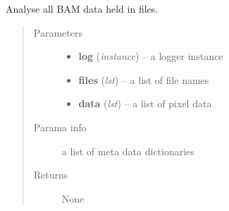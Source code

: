 \documentclass[a4paper,11pt,english]{sphinxmanual}
\begin{document}
\begin{fulllineitems}
\label{analysis:analysis.analyseGaiaBAMCosmicRayData.analyseData}
Analyse all BAM data held in files.
\begin{quote}\begin{description}
\item[{Parameters}] \leavevmode\begin{itemize}
\item {} 
\textbf{log} (\emph{instance}) -- a logger instance

\item {} 
\textbf{files} (\emph{lst}) -- a list of file names

\item {} 
\textbf{data} (\emph{lst}) -- a list of pixel data

\end{itemize}

\item[{Parama info}] \leavevmode
a list of meta data dictionaries

\item[{Returns}] \leavevmode
None

\end{description}\end{quote}

\end{fulllineitems}

\end{document}
